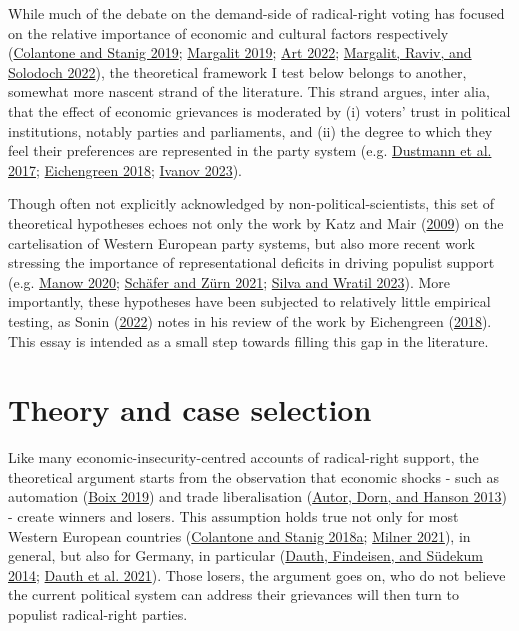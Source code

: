 \documentclass[
]{article}
\begin{document}
While much of the debate on the demand-side of radical-right voting has
focused on the relative importance of economic and cultural factors
respectively (\protect\hyperlink{ref-colantone_surge_2019}{Colantone and
Stanig 2019}; \protect\hyperlink{ref-margalit_economic_2019}{Margalit
2019}; \protect\hyperlink{ref-art_myth_2022}{Art 2022};
\protect\hyperlink{ref-margalit_cultural_2022}{Margalit, Raviv, and
Solodoch 2022}), the theoretical framework I test below belongs to
another, somewhat more nascent strand of the literature. This strand
argues, inter alia, that the effect of economic grievances is moderated
by (i) voters' trust in political institutions, notably parties and
parliaments, and (ii) the degree to which they feel their preferences
are represented in the party system (e.g.
\protect\hyperlink{ref-dustmann_europes_2017}{Dustmann et al. 2017};
\protect\hyperlink{ref-eichengreen_populist_2018}{Eichengreen 2018};
\protect\hyperlink{ref-ivanov_economic_2023}{Ivanov 2023}).

Though often not explicitly acknowledged by non-political-scientists,
this set of theoretical hypotheses echoes not only the work by Katz and
Mair (\protect\hyperlink{ref-katz_cartel_2009}{2009}) on the
cartelisation of Western European party systems, but also more recent
work stressing the importance of representational deficits in driving
populist support (e.g.
\protect\hyperlink{ref-manow_ent-demokratisierung_2020}{Manow 2020};
\protect\hyperlink{ref-schafer_demokratische_2021}{Schäfer and Zürn
2021}; \protect\hyperlink{ref-silva_parties_2023}{Silva and Wratil
2023}). More importantly, these hypotheses have been subjected to
relatively little empirical testing, as Sonin
(\protect\hyperlink{ref-sonin_historical_2022}{2022}) notes in his
review of the work by Eichengreen
(\protect\hyperlink{ref-eichengreen_populist_2018}{2018}). This essay is
intended as a small step towards filling this gap in the literature.

\hypertarget{theory}{%
\section{Theory and case selection}\label{theory}}

Like many economic-insecurity-centred accounts of radical-right support,
the theoretical argument starts from the observation that economic
shocks - such as automation
(\protect\hyperlink{ref-boix_democratic_2019}{Boix 2019}) and trade
liberalisation (\protect\hyperlink{ref-autor_china_2013}{Autor, Dorn,
and Hanson 2013}) - create winners and losers. This assumption holds
true not only for most Western European countries
(\protect\hyperlink{ref-colantone_trade_2018}{Colantone and Stanig
2018a}; \protect\hyperlink{ref-milner_voting_2021}{Milner 2021}), in
general, but also for Germany, in particular
(\protect\hyperlink{ref-dauth_rise_2014}{Dauth, Findeisen, and Südekum
2014}; \protect\hyperlink{ref-dauth_adjustment_2021}{Dauth et al.
2021}). Those losers, the argument goes on, who do not believe the
current political system can address their grievances will then turn to
populist radical-right parties.
\end{document}
